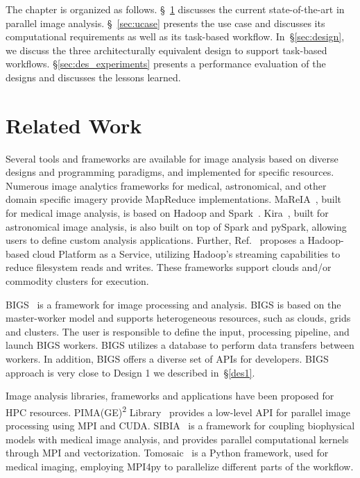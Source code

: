 The chapter is organized as follows. \S~\ref{sec:des_rw} discusses the current
state-of-the-art in parallel image analysis. \S~\ref{sec:ucase} presents the use
case and discusses its computational requirements as well as its task-based
workflow. In~\S\ref{sec:design}, we discuss the three architecturally
equivalent design to support task-based workflows. \S\ref{sec:des_experiments}
presents a performance evaluation of the designs and discusses the lessons
learned.

\section{Related Work}
\label{sec:des_rw}
Several tools and frameworks are available for image analysis based on diverse
designs and programming paradigms, and implemented for specific resources.
Numerous image analytics frameworks for medical, astronomical, and other
domain specific imagery provide MapReduce implementations.
MaReIA~\cite{vo2018mareia}, built for medical image analysis, is based on
Hadoop and Spark~\cite{zaharia2010spark}. Kira~\cite{zhang2016kira}, built for
astronomical image analysis, is also built on top of Spark and pySpark,
allowing users to define custom analysis applications. Further,
Ref.~\cite{yan2014large} proposes a Hadoop-based cloud Platform as a Service,
utilizing Hadoop's streaming capabilities to reduce filesystem reads and
writes. These frameworks support clouds and/or commodity clusters for
execution.

BIGS~\cite{ramos2012bigs} is a framework for image processing and analysis.
BIGS is based on the master-worker model and supports heterogeneous resources,
such as clouds, grids and clusters. The user is responsible to define the
input, processing pipeline, and launch BIGS workers. BIGS utilizes a database
to perform data transfers between workers. In addition, BIGS offers a diverse
set of APIs for developers. BIGS approach is very close to Design 1 we
described in~\S\ref{des1}.

Image analysis libraries, frameworks and applications have been proposed for
HPC resources. PIMA(GE)\textsuperscript{2} Library~\cite{galizia2015mpicuda}
provides a low-level API for parallel image processing using MPI and CUDA.
SIBIA~\cite{gholami2017framework} is a framework for coupling biophysical
models with medical image analysis, and provides parallel computational
kernels through MPI and vectorization. Tomosaic~\cite{vescovi2018tomosaic} is
a Python framework, used for medical imaging, employing MPI4py to parallelize
different parts of the workflow.

